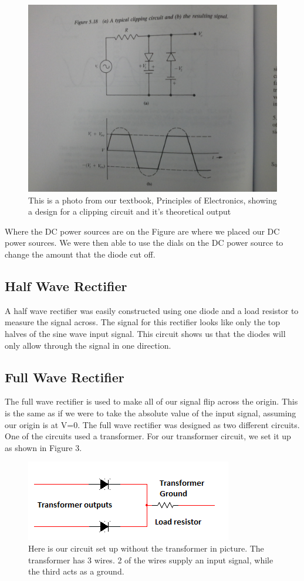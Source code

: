 \documentclass[a4paper]{article}
\begin{document}
\begin{figure}
\centering
\includegraphics[width=.7\textwidth]{Clipping_Circuit_307book.jpg}
\caption{\label{fig:Clipping}This is a photo from our textbook, Principles of Electronics, showing a design for a clipping circuit and it's theoretical output}
\end{figure}

Where the DC power sources are on the Figure are where we placed our DC power sources.  We were then able to use the dials on the DC power source to change the amount that the diode cut off.

\subsection{Half Wave Rectifier}

A half wave rectifier was easily constructed using one diode and a load resistor to measure the signal across.  The signal for this rectifier looks like only the top halves of the sine wave input signal.  This circuit shows us that the diodes will only allow through the signal in one direction.

\subsection{Full Wave Rectifier}

The full wave rectifier is used to make all of our signal flip across the origin.  This is the same as if we were to take the absolute value of the input signal, assuming our origin is at V=0.  The full wave rectifier was designed as two different circuits.  One of the circuits used a transformer.  For our transformer circuit, we set it up as shown in Figure 3.  

\begin{figure}
\centering
\includegraphics[width=.5\textwidth]{AC_to_DC_figure.png}
\caption{\label{fig:ACDC}Here is our circuit set up without the transformer in picture.  The transformer has 3 wires.  2 of the wires supply an input signal, while the third acts as a ground.}
\end{figure}
\end{document}
